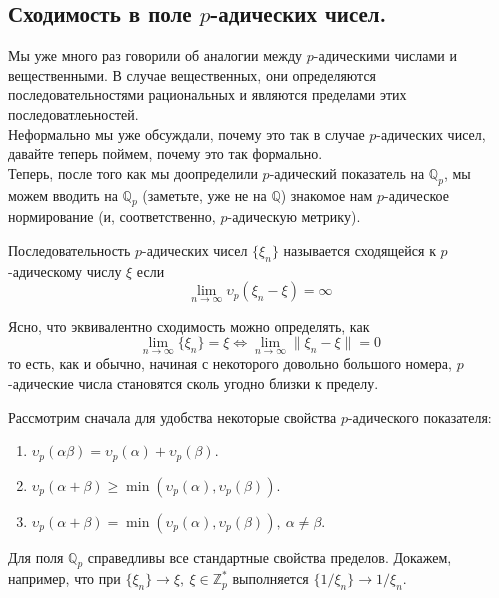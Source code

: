 \documentclass[11pt]{report}
\begin{document}
    \subsection{Сходимость в поле $p$-адических чисел.}
    Мы уже много раз говорили об аналогии между $p$-адическими числами и вещественными. В случае вещественных, они определяются последовательностями
    рациональных и являются пределами этих последоватлеьностей. \\

    Неформально мы уже обсуждали, почему это так в случае $p$-адических чисел, давайте теперь поймем, почему это так формально. \\

    Теперь, после того как мы доопределили $p$-адический показатель на $\mathbb{Q}_p$, мы можем вводить на $\mathbb{Q}_p$ (заметьте, уже не на $\mathbb{Q}$) знакомое
    нам  $p$-адическое нормирование (и, соответственно, $p$-адическую метрику).

    \begin{definition}
        Последовательность $p$-адических чисел $\{ \xi_n \}$ называется сходящейся к $p$-адическому числу  $\xi$ если
        \[ \lim\limits_{n \to \infty} \upsilon_p(\xi_n - \xi) = \infty \]
    \end{definition}
    \begin{remark}
        Ясно, что эквивалентно сходимость можно определять, как
        \[ \lim\limits_{n \to \infty} \{ \xi_n \} = \xi \Leftrightarrow \lim\limits_{n \to \infty}\| \xi_n - \xi \| = 0\]
        то есть, как и обычно, начиная с некоторого довольно большого номера, $p$-адические числа становятся сколь угодно близки к пределу.
    \end{remark}
    Рассмотрим сначала для удобства некоторые свойства $p$-адического показателя:
    \begin{enumerate}
        \item $\upsilon_{p}(\alpha \beta) = \upsilon_p(\alpha) + \upsilon_p{(\beta)} $.

        \item $ \upsilon_p{(\alpha + \beta)} \ge \min(\upsilon_p{(\alpha)}, \upsilon_p{(\beta)})$.

        \item $ \upsilon_p{(\alpha + \beta)} = \min{( \upsilon_p{(\alpha)}, \upsilon_p{(\beta)})}, \ \alpha \neq \beta$.
    \end{enumerate}
    Для поля $\mathbb{Q}_p$ справедливы все стандартные свойства пределов. Докажем, например, что при $\{ \xi_n \} \to \xi, \ \xi \in \mathbb{Z}_p^{*}$ выполняется $\{ 1 / \xi_n \} \to 1 / \xi_n$. \\
\end{document}
